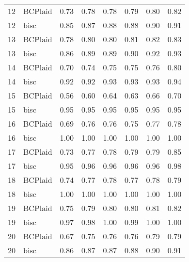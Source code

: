 \begin{table}[ht]
\begin{tabular}{rlrrrrrr}
   12 & BCPlaid & 0.73 & 0.78 & 0.78 & 0.79 & 0.80 & 0.82 \\ 
   12 & bisc & 0.85 & 0.87 & 0.88 & 0.88 & 0.90 & 0.91 \\ 
   13 & BCPlaid & 0.78 & 0.80 & 0.80 & 0.81 & 0.82 & 0.83 \\ 
   13 & bisc & 0.86 & 0.89 & 0.89 & 0.90 & 0.92 & 0.93 \\ 
   14 & BCPlaid & 0.70 & 0.74 & 0.75 & 0.75 & 0.76 & 0.80 \\ 
   14 & bisc & 0.92 & 0.92 & 0.93 & 0.93 & 0.93 & 0.94 \\ 
   15 & BCPlaid & 0.56 & 0.60 & 0.64 & 0.63 & 0.66 & 0.70 \\ 
   15 & bisc & 0.95 & 0.95 & 0.95 & 0.95 & 0.95 & 0.95 \\ 
   16 & BCPlaid & 0.69 & 0.76 & 0.76 & 0.75 & 0.77 & 0.78 \\ 
   16 & bisc & 1.00 & 1.00 & 1.00 & 1.00 & 1.00 & 1.00 \\ 
   17 & BCPlaid & 0.73 & 0.77 & 0.78 & 0.79 & 0.79 & 0.85 \\ 
   17 & bisc & 0.95 & 0.96 & 0.96 & 0.96 & 0.96 & 0.98 \\ 
   18 & BCPlaid & 0.74 & 0.77 & 0.78 & 0.77 & 0.78 & 0.79 \\ 
   18 & bisc & 1.00 & 1.00 & 1.00 & 1.00 & 1.00 & 1.00 \\ 
   19 & BCPlaid & 0.75 & 0.79 & 0.80 & 0.80 & 0.81 & 0.82 \\ 
   19 & bisc & 0.97 & 0.98 & 1.00 & 0.99 & 1.00 & 1.00 \\ 
   20 & BCPlaid & 0.67 & 0.75 & 0.76 & 0.76 & 0.79 & 0.79 \\ 
   20 & bisc & 0.86 & 0.87 & 0.87 & 0.88 & 0.90 & 0.91 \\ 
   \bottomrule
\end{tabular}
\end{table}

